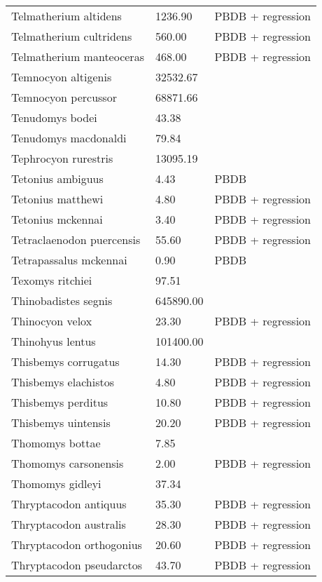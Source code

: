 \documentclass{article}
\begin{document}
\begin{center}
\begin{longtable}{p{} p{} p{}}
    Telmatherium altidens & 1236.90 & PBDB + regression \\ 
    Telmatherium cultridens & 560.00 & PBDB + regression \\ 
    Telmatherium manteoceras & 468.00 & PBDB + regression \\ 
    Temnocyon altigenis & 32532.67 & \cite{Tomiya2013} \\ 
    Temnocyon percussor & 68871.66 & \cite{Tomiya2013} \\ 
    Tenudomys bodei & 43.38 & \cite{Tomiya2013} \\ 
    Tenudomys macdonaldi & 79.84 & \cite{Tomiya2013} \\ 
    Tephrocyon rurestris & 13095.19 & \cite{Tomiya2013} \\ 
    Tetonius ambiguus & 4.43 & PBDB \\ 
    Tetonius matthewi & 4.80 & PBDB + regression \\ 
    Tetonius mckennai & 3.40 & PBDB + regression \\ 
    Tetraclaenodon puercensis & 55.60 & PBDB + regression \\ 
    Tetrapassalus mckennai & 0.90 & PBDB \\ 
    Texomys ritchiei & 97.51 & \cite{Tomiya2013} \\ 
    Thinobadistes segnis & 645890.00 & \cite{McDonald2005} \\ 
    Thinocyon velox & 23.30 & PBDB + regression \\ 
    Thinohyus lentus & 101400.00 & \cite{McKenna2011} \\ 
    Thisbemys corrugatus & 14.30 & PBDB + regression \\ 
    Thisbemys elachistos & 4.80 & PBDB + regression \\ 
    Thisbemys perditus & 10.80 & PBDB + regression \\ 
    Thisbemys uintensis & 20.20 & PBDB + regression \\ 
    Thomomys bottae & 7.85 & \cite{Smith2004} \\ 
    Thomomys carsonensis & 2.00 & PBDB + regression \\ 
    Thomomys gidleyi & 37.34 & \cite{Tomiya2013} \\ 
    Thryptacodon antiquus & 35.30 & PBDB + regression \\ 
    Thryptacodon australis & 28.30 & PBDB + regression \\ 
    Thryptacodon orthogonius & 20.60 & PBDB + regression \\ 
    Thryptacodon pseudarctos & 43.70 & PBDB + regression \\ 

\end{longtable}
\end{center}
\end{document}
